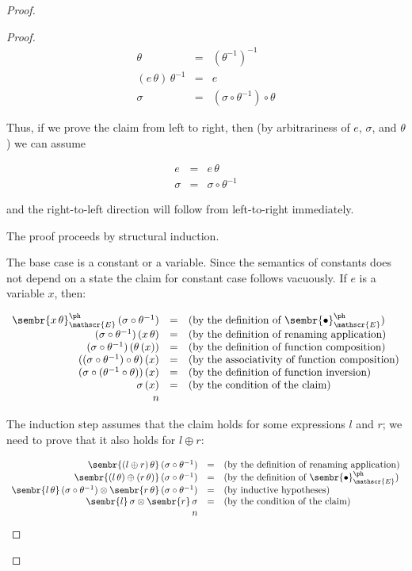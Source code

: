 \begin{proof}
\begin{proof}
    \[
    \begin{array}{rcl}
      \theta&=&(\theta^{-1})^{-1}\\
      (e\,\theta)\,\theta^{-1}&=&e\\
      \sigma&=&(\sigma\circ\theta^{-1})\circ\theta
    \end{array}
    \]

    Thus, if we prove the claim from left to right, then (by arbitrariness of $e$, $\sigma$, and $\theta$) we can
    assume

    \[
    \begin{array}{rcl}
      e&=&e\,\theta\\
      \sigma&=&\sigma\circ\theta^{-1}
    \end{array}
    \]

    and the right-to-left direction will follow from left-to-right immediately.

    The proof proceeds by structural induction.

    The base case is a constant or a variable. Since the semantics of constants does not depend on a state the
    claim for constant case follows vacuously. If $e$ is a variable $x$, then:

    \[
    \begin{array}{rcl}
      \sembr{x\,\theta}^\ph_\mathscr{E}\,(\sigma\circ\theta^{-1})&=&\mbox{(by the definition of $\sembr{\bullet}^\ph_\mathscr{E}$)}\\
      (\sigma\circ\theta^{-1})\,(x\,\theta)&=&\mbox{(by the definition of renaming application)}\\
      (\sigma\circ\theta^{-1})\,(\theta\,(x))&=&\mbox{(by the definition of function composition)}\\
      ((\sigma\circ\theta^{-1})\circ\theta)\,(x)&=&\mbox{(by the associativity of function composition)}\\
      (\sigma\circ(\theta^{-1}\circ\theta))\,(x)&=&\mbox{(by the definition of function inversion)}\\
      \sigma\,(x)&=&\mbox{(by the condition of the claim)}\\
      n&&
    \end{array}
    \]

    The induction step assumes that the claim holds for some expressions $l$ and $r$; we need to prove that it also holds for
    $l\oplus r$:

    \[
    \begin{array}{rcl}
      \sembr{(l\oplus r)\,\theta}\,(\sigma\circ\theta^{-1})&=&\mbox{(by the definition of renaming application)}\\
      \sembr{(l\,\theta)\oplus(r\,\theta)}\,(\sigma\circ\theta^{-1})&=&\mbox{(by the definition of $\sembr{\bullet}^\ph_\mathscr{E}$)}\\
      \sembr{l\,\theta}\,(\sigma\circ\theta^{-1})\otimes\sembr{r\,\theta}\,(\sigma\circ\theta^{-1})&=&\mbox{(by inductive hypotheses)}\\
      \sembr{l}\,\sigma\otimes\sembr{r}\,\sigma&=&\mbox{(by the condition of the claim)}\\
      n&&
    \end{array}
    \]


\end{proof}
\end{proof}
